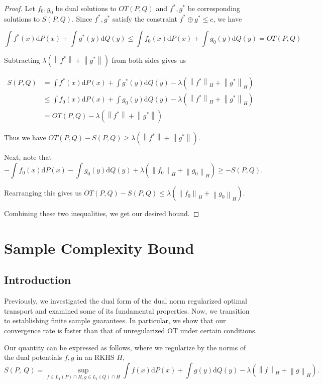 \begin{proof}
	Let $f_0, g_0$ be dual solutions to $OT(P,Q)$ and $f^{*},g^{*}$ be corresponding solutions to $S(P,Q)$. Since $f^{*},g^{*}$ satisfy the constraint $f^{*}\oplus g^{*}\leq c$, we have
	
	$$\int f^{*}(x)\mathrm{d}P(x)+\int g^{*}(y)\mathrm{d}Q(y) \leq \int f_0(x)\mathrm{d}P(x)+\int g_0(y)\mathrm{d}Q(y) = OT(P,Q)$$
	
	Subtracting $\lambda(\left\|f^{*}\right\| + \left\|g^{*}\right\|)$ from both sides gives us
	
	\begin{align*}
		S(P,Q)&=\int f^{*}(x)\mathrm{d}P(x)+\int g^{*}(y)\mathrm{d}Q(y) - \lambda(\left\|f^{*}\right\|_H + \left\|g^{*}\right\|_H) \\
		&\leq \int f_0(x)\mathrm{d}P(x)+\int g_0(y)\mathrm{d}Q(y) - \lambda(\left\|f^{*}\right\|_H + \left\|g^{*}\right\|_H) \\
		&= OT(P,Q) - \lambda(\left\|f^{*}\right\| + \left\|g^{*}\right\|)
	\end{align*}
	
	Thus we have $OT(P,Q)-S(P,Q)\geq \lambda(\left\|f^{*}\right\| + \left\|g^{*}\right\|)$.
	
	Next, note that
	$$
	-\int f_0(x)\mathrm{d}P(x)-\int g_0(y)\mathrm{d}Q(y)+\lambda(\left\|f_0\right\|_H+\left\|g_0\right\|_H) \geq -S(P,Q).
	$$
	
	Rearranging this gives us $OT(P,Q)-S(P,Q)\leq \lambda(\left\|f_0\right\|_H+\left\|g_0\right\|_H).$
	
	Combining these two inequalities, we get our desired bound.
\end{proof}

\section{Sample Complexity Bound}

	\subsection*{Introduction}
	Previously, we investigated the dual form of the dual norm regularized optimal transport and examined some of its fundamental properties. Now, we transition to establishing finite sample guarantees. In particular, we show that our convergence rate is faster than that of unregularized OT under certain conditions.

	Our quantity can be expressed as follows, where we regularize by the norms of the dual potentials $f,g$ in an RKHS $H$,
	$$S(P,\displaystyle \ Q)=\sup_{f\in L_{1}(P) \cap H,g\in L_{1}(Q) \cap H}\int f(x)\mathrm{d}P(x)+\int g(y)\mathrm{d}Q(y)-\lambda(\left\|f\right\|_H+\left\|g\right\|_H).$$
	
